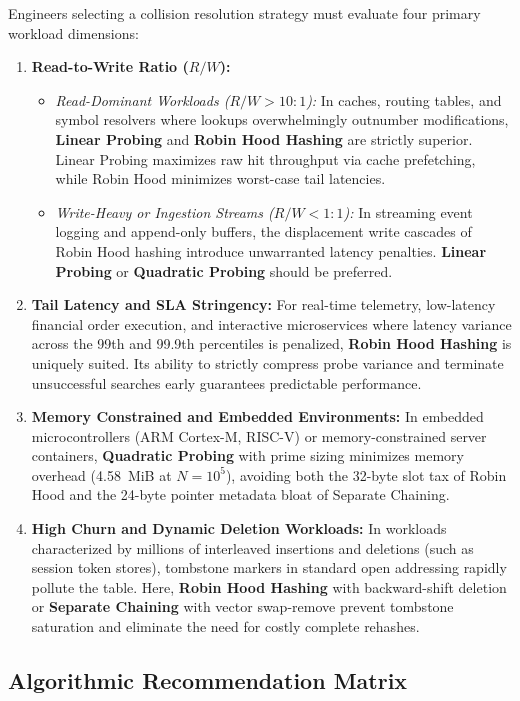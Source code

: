 \documentclass[conference]{IEEEtran}
\begin{document}
Engineers selecting a collision resolution strategy must evaluate four primary workload dimensions:
\begin{enumerate}
  \item \textbf{Read-to-Write Ratio ($R / W$):}
  \begin{itemize}
    \item \emph{Read-Dominant Workloads ($R / W > 10:1$):} In caches, routing tables, and symbol resolvers where lookups overwhelmingly outnumber modifications, \textbf{Linear Probing} and \textbf{Robin Hood Hashing} are strictly superior. Linear Probing maximizes raw hit throughput via cache prefetching, while Robin Hood minimizes worst-case tail latencies.
    \item \emph{Write-Heavy or Ingestion Streams ($R / W < 1:1$):} In streaming event logging and append-only buffers, the displacement write cascades of Robin Hood hashing introduce unwarranted latency penalties. \textbf{Linear Probing} or \textbf{Quadratic Probing} should be preferred.
  \end{itemize}
  \item \textbf{Tail Latency and SLA Stringency:} For real-time telemetry, low-latency financial order execution, and interactive microservices where latency variance across the 99th and 99.9th percentiles is penalized, \textbf{Robin Hood Hashing} is uniquely suited. Its ability to strictly compress probe variance and terminate unsuccessful searches early guarantees predictable performance.
  \item \textbf{Memory Constrained and Embedded Environments:} In embedded microcontrollers (ARM Cortex-M, RISC-V) or memory-constrained server containers, \textbf{Quadratic Probing} with prime sizing minimizes memory overhead (4.58~MiB at $N = 10^5$), avoiding both the 32-byte slot tax of Robin Hood and the 24-byte pointer metadata bloat of Separate Chaining.
  \item \textbf{High Churn and Dynamic Deletion Workloads:} In workloads characterized by millions of interleaved insertions and deletions (such as session token stores), tombstone markers in standard open addressing rapidly pollute the table. Here, \textbf{Robin Hood Hashing} with backward-shift deletion or \textbf{Separate Chaining} with vector swap-remove prevent tombstone saturation and eliminate the need for costly complete rehashes.
\end{enumerate}

\subsection{Algorithmic Recommendation Matrix}
\end{document}
